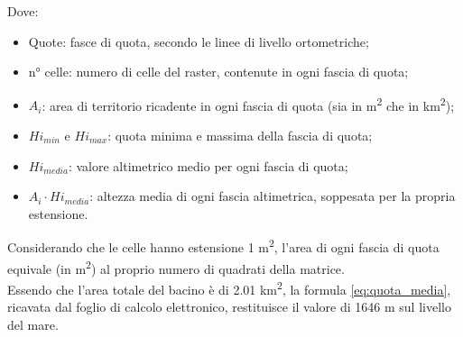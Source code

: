 Dove:
\begin{itemize}
    \item Quote: fasce di quota, secondo le linee di livello ortometriche;
    \item n° celle: numero di celle del raster, contenute in ogni fascia di quota;
    \item $A_i$: area di territorio ricadente in ogni fascia di quota (sia in \unit{m^2} che in \unit{km^2});
    \item $Hi_{min}$ e $Hi_{max}$: quota minima e massima della fascia di quota;
    \item $Hi_{media}$: valore altimetrico medio per ogni fascia di quota;
    \item $A_i \cdot Hi_{media}$: altezza media di ogni fascia altimetrica, soppesata per la propria estensione.
\end{itemize}
Considerando che le celle hanno estensione 1 \unit{m^2}, l'area di ogni fascia di quota equivale (in \unit{m^2}) al proprio numero di quadrati della matrice.\\
Essendo che l'area totale del bacino è di 2.01 \unit{km^2}, la formula \eqref{eq:quota_media}, ricavata dal foglio di calcolo elettronico, restituisce il valore di 1646 \unit{m} sul livello del mare.

